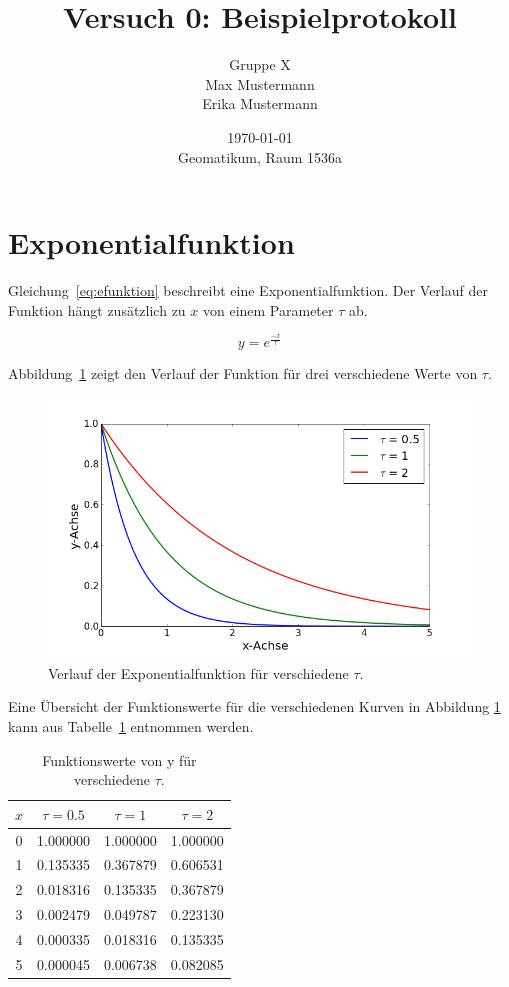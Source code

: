 \documentclass[a4paper]{article}
\title{Versuch 0: Beispielprotokoll}
\author{Gruppe X\\Max Mustermann\\Erika Mustermann}
\date{\today\\Geomatikum, Raum 1536a}
\begin{document}
\maketitle
\thispagestyle{empty}\newpage
\thispagestyle{empty}\newpage
\tableofcontents
\newpage

\section{Exponentialfunktion}
Gleichung~\ref{eq:efunktion} beschreibt eine Exponentialfunktion. Der Verlauf
der Funktion hängt zusätzlich zu $x$ von einem Parameter $\tau$ ab.

\begin{equation}\label{eq:efunktion}
y = e^{\frac{-x}{\tau}}
\end{equation}

Abbildung~\ref{fig:efunktion} zeigt den Verlauf der Funktion für drei
verschiedene Werte von $\tau$.

\begin{figure}[ht]
  \centering
  \includegraphics[width=\textwidth]{plot.png}
  \caption{Verlauf der Exponentialfunktion für verschiedene $\tau$.}
  \label{fig:efunktion}
\end{figure}

Eine Übersicht der Funktionswerte für die verschiedenen Kurven in Abbildung
\ref{fig:efunktion} kann aus Tabelle~\ref{tab:funktionswerte} entnommen werden.

\begin{table}[ht]
  \centering
  \caption{Funktionswerte von y für verschiedene $\tau$.}
  \begin{tabular}{|c|c|c|c|}\hline
  $x$ & $\tau =0.5$ & $\tau=1$ & $\tau=2$\\\hline
  0 & 1.000000 & 1.000000 & 1.000000\\\hline
  1 & 0.135335 & 0.367879 & 0.606531\\\hline
  2 & 0.018316 & 0.135335 & 0.367879\\\hline
  3 & 0.002479 & 0.049787 & 0.223130\\\hline
  4 & 0.000335 & 0.018316 & 0.135335\\\hline
  5 & 0.000045 & 0.006738 & 0.082085\\\hline
  \end{tabular}
  \label{tab:funktionswerte}
\end{table}
\end{document}
